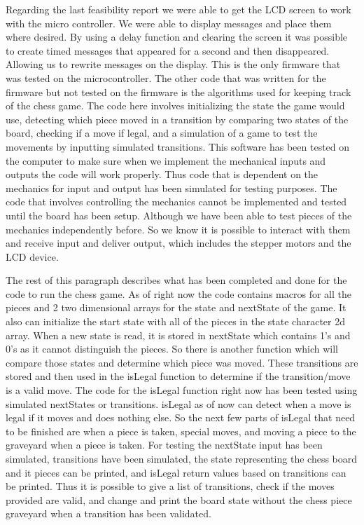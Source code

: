 \documentclass{article}
\begin{document}
Regarding the last feasibility report we were able to get the LCD screen to work with the micro controller. We were able to display messages and place them where desired. By using a delay function and clearing the screen it was possible to create timed messages that appeared for a second and then disappeared. Allowing us to rewrite messages on the display. This is the only firmware that was tested on the microcontroller. The other code that was written for the firmware but not tested on the firmware is the algorithms used for keeping track of the chess game. The code here involves initializing the state the game would use, detecting which piece moved in a transition by comparing two states of the board, checking if a move if legal, and a simulation of a game to test the movements by inputting simulated transitions. This software has been tested on the computer to make sure when we implement the mechanical inputs and outputs the code will work properly. Thus code that is dependent on the mechanics for input and output has been simulated for testing purposes. The code that involves controlling the mechanics cannot be implemented and tested until the board has been setup. Although we have been able to test pieces of the mechanics independently before. So we know it is possible to interact with them and receive input and deliver output, which includes the stepper motors and the LCD device. 

\indent

The rest of this paragraph describes what has been completed and done for the code to run the chess game. As of right now the code contains macros for all the pieces and 2 two dimensional arrays for the state and nextState of the game. It also can initialize the start state with all of the pieces in the state character 2d array. When a new state is read, it is stored in nextState which contains 1’s and 0’s as it cannot distinguish the pieces. So there is another function which will compare those states and determine which piece was moved. These transitions are stored and then used in the isLegal function to determine if the transition/move is a valid move. The code for the isLegal function right now has been tested using simulated nextStates or transitions. isLegal as of now can detect when a move is legal if it moves and does nothing else. So the next few parts of isLegal that need to be finished are when a piece is taken, special moves, and moving a piece to the graveyard when a piece is taken. For testing the nextState input has been simulated, transitions have been simulated, the state representing the chess board and it pieces can be printed, and isLegal return values based on transitions can be printed. Thus it is possible to give a list of transitions, check if the moves provided are valid, and change and print the board state without the chess piece graveyard when a transition has been validated.
\end{document}
